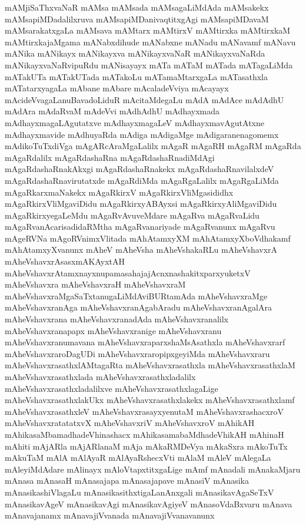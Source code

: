 {mAMjiSaThxvaNaR
mAMsa
mAMsada
mAMsagaLiMdAda
mAMsakekx
mAMsapiMDadalilxruva
mAMsapiMDanivaqtitxgAgi
mAMsapiMDavaM
mAMsarakatxgaLa
mAMsava
mAMtarx
mAMtirxV
mAMtirxka
mAMtirxkaM
mAMtirxkajaMgama
mANabxdihude
mANabxne
mANadu
mANavamf
mANavu
mANika
mANikayx
mANikayxva
mANikayxvaNaR
mANikayxvaNaRda
mANikayxvaNaRvipuRdu
mANisayayx
mATa
mATaM
mATada
mATagaLiMda
mATakUTa
mATakUTada
mATakoLu
mATamaMtarxgaLa
mATasathxla
mATatarxyagaLa
mAbane
mAbare
mAcaladeVviya
mAcayayx
mAcideVvagaLanuBavadoLiduR
mAcitaMdegaLu
mAdA
mAdAce
mAdAdhU
mAdAra
mAdaRvaM
mAdeVvi
mAdhAdhU
mAdhayxmada
mAdhayxmagaLAgutatxve
mAdhayxmagaLeV
mAdhayxmavAgutAtxne
mAdhayxmavide
mAdhuyaRda
mAdiga
mAdigaMge
mAdigaranenagomemx
mAdikoTuTxdiVga
mAgARcAraMgaLalilx
mAgaR
mAgaRH
mAgaRM
mAgaRda
mAgaRdalilx
mAgaRdashaRna
mAgaRdashaRnadiMdAgi
mAgaRdashaRnakAkxgi
mAgaRdashaRnakekx
mAgaRdashaRnavilalxdeV
mAgaRdashaRnavirutatxde
mAgaRdiMda
mAgaRgaLalilx
mAgaRgaLiMda
mAgaRkarxmaNakekx
mAgaRkirxV
mAgaRkirxVliMgasididhx
mAgaRkirxVliMgaviDidu
mAgaRkirxyABAyxsi
mAgaRkirxyAliMgaviDidu
mAgaRkirxyegaLeMdu
mAgaRvAvuveMdare
mAgaRva
mAgaRvaLidu
mAgaRvanAcarisadidaRMtha
mAgaRvanariyade
mAgaRvanunx
mAgaRvu
mAgeRVNa
mAgoRVnimxVlitada
mAhAtamxyXM
mAhAtamxyXboVdhakamf
mAhAtamxyXvanunx
mAheV
mAheVsha
mAheVshakaRLu
mAheVshavxrA
mAheVshavxrAsasxmAKAyxtAH
mAheVshavxrAtamxnayxnupamasahajajAcnxnashakitxparxyuketxV
mAheVshavxra
mAheVshavxraH
mAheVshavxraM
mAheVshavxraMgaSaTxtanugaLiMdAviBURtamAda
mAheVshavxraMge
mAheVshavxranAga
mAheVshavxranAgabAradu
mAheVshavxranAgalAra
mAheVshavxrana
mAheVshavxranadAda
mAheVshavxranalilx
mAheVshavxranapapx
mAheVshavxranige
mAheVshavxranu
mAheVshavxranumavana
mAheVshavxraparxshaMsAsathxla
mAheVshavxrarf
mAheVshavxraroDagUDi
mAheVshavxraropipxgeyiMda
mAheVshavxraru
mAheVshavxrasathxlAMtagaRta
mAheVshavxrasathxla
mAheVshavxrasathxlaM
mAheVshavxrasathxlada
mAheVshavxrasathxladalilx
mAheVshavxrasathxladalilxve
mAheVshavxrasathxlagaLige
mAheVshavxrasathxlakUkx
mAheVshavxrasathxlakekx
mAheVshavxrasathxlamf
mAheVshavxrasathxleV
mAheVshavxrasayxyenutaM
mAheVshavxrashacxroV
mAheVshavxratatatxvX
mAheVshavxriV
mAheVshavxroV
mAhikAH
mAhikasaMbamadhadeVhinashacx
mAhikasamabaMdhadeVhikAH
mAhinaH
mAhiti
mAjARla
mAjARlanaM
mAja
mAkaRMDeVya
mAkaSxra
mAkoTuTx
mAkuTaM
mAlA
mAlAyaR
mAlAyaRshecxVti
mAlaM
mAleV
mAlegaLa
mAleyiMdAdare
mAlinayx
mAloVtapxtitxgaLige
mAmf
mAnadali
mAnakaMjaru
mAnasa
mAnasaH
mAnasajapa
mAnasajapave
mAnasiV
mAnasika
mAnasikashiVlagaLu
mAnasikasithxtigaLanAnxgali
mAnasikavAgaSeTxV
mAnasikavAgeV
mAnasikavAgi
mAnasikavAgiyeV
mAnasoVdaBxvaru
mAnava
mAnavajanamx
mAnavajiVvanada
mAnavajiVvanavanunx
}
